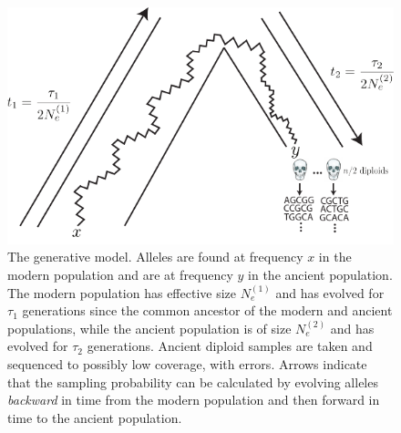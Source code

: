 \documentclass[11pt, oneside]{article}   	%
\begin{document}
\begin{figure}[h] %
   \centering
   \includegraphics[width=.9\textwidth]{backward_forward_v2.pdf} 
	\caption{The generative model. Alleles are found at frequency $x$ in the modern population and are at frequency $y$ in the ancient population. The modern population has effective size $N_e^{(1)}$ and has evolved for $\tau_1$ generations since the common ancestor of the modern and ancient populations, while the ancient population is of size $N_e^{(2)}$ and has evolved for $\tau_2$ generations. Ancient diploid samples are taken and sequenced to possibly low coverage, with errors. Arrows indicate that the sampling probability can be calculated by evolving alleles \emph{backward} in time from the modern population and then forward in time to the ancient population.}
	\label{generative_model}
\end{figure}
\end{document}
